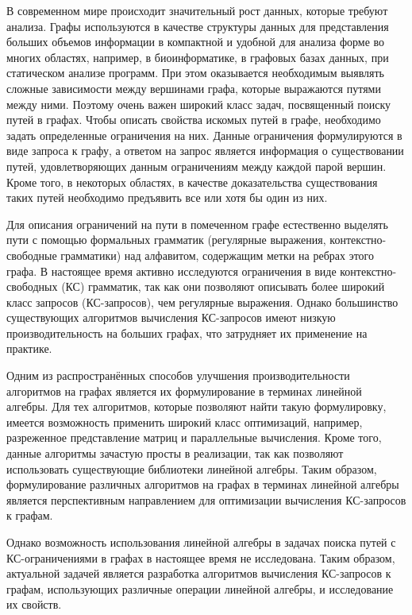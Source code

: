 
{\actuality} 
В современном мире происходит значительный рост данных, которые требуют анализа. Графы используются в качестве структуры данных для представления больших объемов информации в компактной и удобной для анализа форме во многих областях, например, в биоинформатике, в графовых базах данных, при статическом анализе программ. При этом оказывается необходимым выявлять сложные зависимости между вершинами графа, которые выражаются путями между ними. Поэтому очень важен широкий класс задач, посвященный поиску путей в графах. Чтобы описать свойства искомых путей в графе, необходимо задать определенные ограничения на них. Данные ограничения формулируются в виде запроса к графу, а ответом на запрос является информация о существовании путей, удовлетворяющих данным ограничениям между каждой парой вершин. Кроме того, в некоторых областях, в качестве доказательства существования таких путей необходимо предъявить все или хотя бы один из них.

Для описания ограничений на пути в помеченном графе естественно выделять пути с помощью формальных грамматик (регулярные выражения, контекстно-свободные грамматики) над алфавитом, содержащим метки на ребрах этого графа. В настоящее время активно исследуются ограничения в виде контекстно-свободных (КС) грамматик, так как они позволяют описывать более широкий класс запросов (КС-запросов), чем регулярные выражения. Однако большинство существующих алгоритмов вычисления КС-запросов имеют низкую производительность на больших графах, что затрудняет их применение на практике.

Одним из распространённых способов улучшения производительности алгоритмов на графах является их формулирование в терминах линейной алгебры. Для тех алгоритмов, которые позволяют найти такую формулировку, имеется возможность применить широкий класс оптимизаций, например, разреженное представление матриц и параллельные вычисления. Кроме того, данные алгоритмы зачастую просты в реализации, так как позволяют использовать существующие библиотеки линейной алгебры. Таким образом, формулирование различных алгоритмов на графах в терминах линейной алгебры является перспективным направлением для оптимизации вычисления КС-запросов к графам.

Однако возможность использования линейной алгебры в задачах поиска путей с КС-ограничениями в графах в настоящее время не исследована. Таким образом, актуальной задачей является разработка алгоритмов вычисления КС-запросов к графам, использующих различные операции линейной алгебры, и исследование их свойств.


